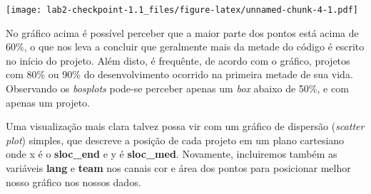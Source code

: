 \documentclass[]{article}
\newenvironment{Shaded}{\begin{snugshade}}{\end{snugshade}}
\newcommand{\KeywordTok}[1]{\textcolor[rgb]{0.13,0.29,0.53}{\textbf{#1}}}
\newcommand{\DataTypeTok}[1]{\textcolor[rgb]{0.13,0.29,0.53}{#1}}
\newcommand{\DecValTok}[1]{\textcolor[rgb]{0.00,0.00,0.81}{#1}}
\newcommand{\StringTok}[1]{\textcolor[rgb]{0.31,0.60,0.02}{#1}}
\newcommand{\OtherTok}[1]{\textcolor[rgb]{0.56,0.35,0.01}{#1}}
\newcommand{\OperatorTok}[1]{\textcolor[rgb]{0.81,0.36,0.00}{\textbf{#1}}}
\newcommand{\NormalTok}[1]{#1}
\begin{document}
\texttt{[image: lab2-checkpoint-1.1\_files/figure-latex/unnamed-chunk-4-1.pdf]}

No gráfico acima é possível perceber que a maior parte dos pontos está
acima de 60\%, o que nos leva a concluir que geralmente mais da metade
do código é escrito no início do projeto. Além disto, é frequênte, de
acordo com o gráfico, projetos com 80\% ou 90\% do desenvolvimento
ocorrido na primeira metade de sua vida. Observando os \emph{bosplots}
pode-se perceber apenas um \emph{box} abaixo de 50\%, e com apenas um
projeto.

Uma visualização mais clara talvez possa vir com um gráfico de dispersão
(\emph{scatter plot}) simples, que descreve a posição de cada projeto em
um plano cartesiano onde x é o \textbf{sloc\_end} e y é
\textbf{sloc\_med}. Novamente, incluiremos também as variáveis
\textbf{lang} e \textbf{team} nos canais cor e área dos pontos para
posicionar melhor nosso gráfico nos nossos dados.

\begin{Shaded}
\end{Shaded}
\end{document}

